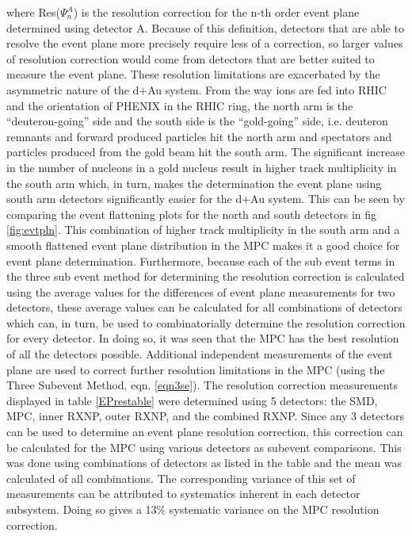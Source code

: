 where Res($\Psi_n^A$) is the resolution correction for the n-th order event plane determined using detector A. Because of this definition, detectors that are able to resolve the event plane more precisely require less of a correction, so larger values of resolution correction would come from detectors that are better suited to measure the event plane. These resolution limitations are exacerbated by the asymmetric nature of the d+Au system. From the way ions are fed into RHIC and the orientation of PHENIX in the RHIC ring, the north arm is the ``deuteron-going'' side and the south side is the ``gold-going'' side, i.e. deuteron remnants and forward produced particles hit the north arm and spectators and particles produced from the gold beam hit the south arm. The significant increase in the number of nucleons in a gold nucleus result in higher track multiplicity in the south arm which, in turn, makes the determination the event plane using south arm detectors significantly easier for the d+Au system. This can be seen by comparing the event flattening plots for the north and south detectors in fig \ref{fig:evtpln}. This combination of higher track multiplicity in the south arm and a smooth flattened event plane distribution in the MPC makes it a good choice for event plane determination. Furthermore, because each of the sub event terms in the three sub event method for determining the resolution correction is calculated using the average values for the differences of event plane measurements for two detectors, these average values can be calculated for all combinations of detectors which can, in turn, be used to combinatorially determine the resolution correction for every detector. In doing so, it was seen that the MPC has the best resolution of all the detectors possible. Additional independent measurements of the event plane are used to correct further resolution limitations in the MPC (using the Three Subevent Method, eqn. \ref{eqn3se}). The resolution correction measurements displayed in table \ref{EPrestable} were determined using 5 detectors: the SMD, MPC, inner RXNP, outer RXNP, and the combined RXNP. Since any 3 detectors can be used to determine an event plane resolution correction, this correction can be calculated for the MPC using various detectors as subevent comparisons. This was done using combinations of detectors as listed in the table and the mean was calculated of all combinations. The corresponding variance of this set of measurements can be attributed to systematics inherent in each detector subsystem. Doing so gives a 13\% systematic variance on the MPC resolution correction.

